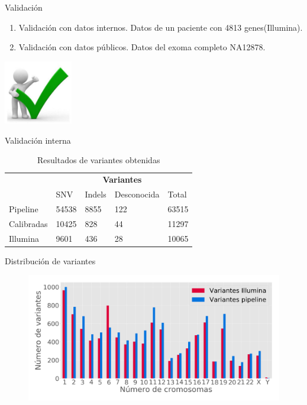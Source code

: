 \documentclass[xcolor=dvipsnames]{beamer}
\begin{document}
\begin{frame}{Validación}
	
	\begin{enumerate}[1.]
		\item Validación con datos internos. Datos de un paciente con 4813 genes(Illumina).
		\item Validación con datos públicos. Datos del exoma completo NA12878.
	\end{enumerate}
	\centering
	\includegraphics[width=30mm]{validacion.png}
	
\end{frame}

\begin{frame}{Validación interna}
\begin{table}[h!]
	\centering
	\footnotesize
	\begin{table}[]
		\begin{tabular}{l|l|l|l|l|}
			\cline{2-5}
			& \multicolumn{4}{c|}{\textbf{Variantes}} \\ \cline{2-5} 
			& SNV    & Indels  & Desconocida  & Total \\ \hline
			\multicolumn{1}{|l|}{Pipeline}   & 54538  & 8855    & 122          & 63515 \\ \hline
			\multicolumn{1}{|l|}{Calibradas} & 10425  & 828     & 44           & 11297 \\ \hline
			\multicolumn{1}{|l|}{Illumina}   & 9601   & 436     & 28           & 10065 \\ \hline
		\end{tabular}
	\end{table}
	\caption{Resultados de variantes obtenidas}
\end{table}
\end{frame}

\begin{frame}{Distribución de variantes}
	\begin{figure}[]
		\centering
		\includegraphics[width=1\textwidth]{validacion1}
		\end{figure}
\end{frame}
\end{document}
